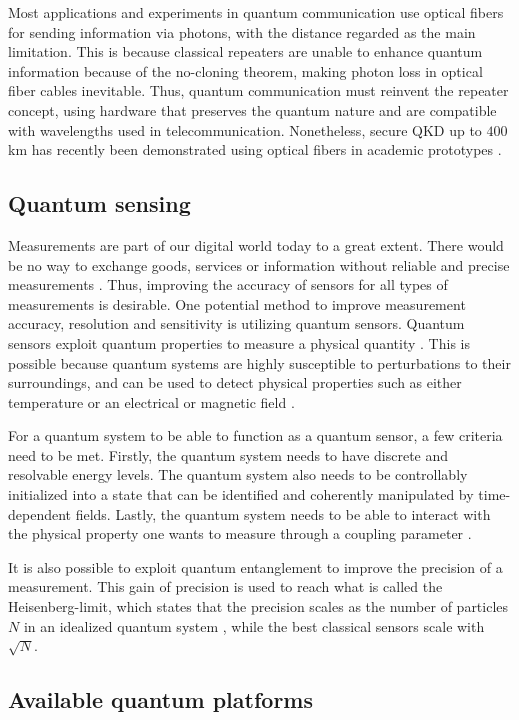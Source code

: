 Most applications and experiments in quantum communication use optical fibers for sending information via photons, with the distance regarded as the main limitation. This is because classical repeaters are unable to enhance quantum information because of the no-cloning theorem, making photon loss in optical fiber cables inevitable. Thus, quantum communication must reinvent the repeater concept, using hardware that preserves the quantum nature \cite{Acin2018} and are compatible with wavelengths used in telecommunication. Nonetheless, secure QKD up to $400$ km has recently been demonstrated using optical fibers in academic prototypes \cite{Boaron2018}.

\subsection{Quantum sensing}

Measurements are part of our digital world today to a great extent. There would be no way to exchange goods, services or information without reliable and precise measurements \cite{Acin2018}. Thus, improving the accuracy of sensors for all types of measurements is desirable. One potential method to improve measurement accuracy, resolution and sensitivity is utilizing quantum sensors. Quantum sensors exploit quantum properties to measure a physical quantity \cite{Degen2017}. This is possible because quantum systems are highly susceptible to perturbations to their surroundings, and can be used to detect physical properties such as either temperature or an electrical or magnetic field \cite{Degen2017}.

For a quantum system to be able to function as a quantum sensor, a few criteria need to be met.  Firstly, the quantum system needs to have discrete and resolvable energy levels. The quantum system also needs to be controllably initialized into a state that can be identified and coherently manipulated by time-dependent fields. Lastly, the quantum system needs to be able to interact with the physical property one wants to measure through a coupling parameter \cite{Degen2017}.

It is also possible to exploit quantum entanglement to improve the precision of a measurement. This gain of precision is used to reach what is called the Heisenberg-limit, which states that the precision scales as the number of particles $N$ in an idealized quantum system \cite{Degen2017, Acin2018}, while the best classical sensors scale with $\sqrt{N}$.

\subsection{Available quantum platforms}

